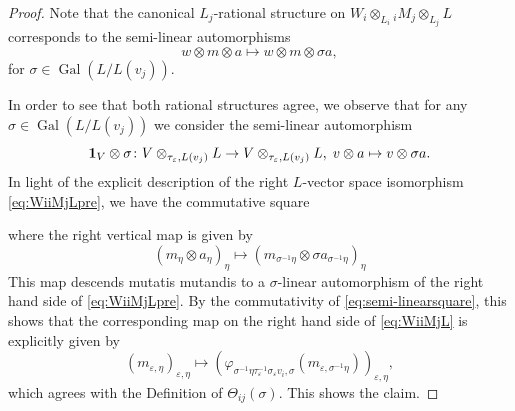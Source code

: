 \documentclass[a4paper,12pt,reqno]{amsart}
\DeclareMathOperator{\Gal}{\mathrm {Gal}}
\theoremstyle{plain}
\theoremstyle{remark}
\begin{document}
    \begin{proof}
      Note that the canonical $L_j$-rational structure on $W_i \otimes_{L_i} {}_iM_j\otimes_{L_j}L$ corresponds to the semi-linear automorphisms
      \[w\otimes m\otimes a\mapsto w\otimes m\otimes\sigma a,\]
      for $\sigma\in\Gal(L/L(v_j))$.

      In order to see that both rational structures agree, we observe that for any $\sigma\in\Gal(L/L(v_j))$ we consider the semi-linear automorphism
    \[
    {\bf1}_{V}\otimes \sigma\colon V\otimes_{\tau_\varepsilon,L(v_j)}L\to V\otimes_{\tau_\varepsilon,L(v_j)}L,\;v\otimes a\mapsto v\otimes\sigma a.
    \]
    In light of the explicit description of the right $L$-vector space isomorphism \eqref{eq:WiiMjLpre}, we have the commutative square
    \begin{center}
    \end{center}
    where the right vertical map is given by
    \begin{equation}
      (m_\eta\otimes a_\eta)_{\eta}\mapsto (m_{\sigma^{-1}\eta}\otimes \sigma a_{\sigma^{-1}\eta} )_{\eta}
      \label{eq:explicitdecompositiontwisting}
    \end{equation}
    This map descends mutatis mutandis to a $\sigma$-linear automorphism of the right hand side of \eqref{eq:WiiMjLpre}. By the commutativity of \eqref{eq:semi-linearsquare}, this shows that the corresponding map on the right hand side of \eqref{eq:WiiMjL} is explicitly given by
    \[
    (m_{\varepsilon,\eta})_{\varepsilon,\eta}\mapsto
    \left(\varphi_{\sigma^{-1}\eta\tau_\varepsilon^{-1}\sigma_\varepsilon v_i,\sigma}(m_{\varepsilon,\sigma^{-1}\eta})\right)_{\varepsilon,\eta},
    \]
    which agrees with the Definition of $\Theta_{ij}(\sigma)$. This shows the claim.
    \end{proof}
    
\end{document}

